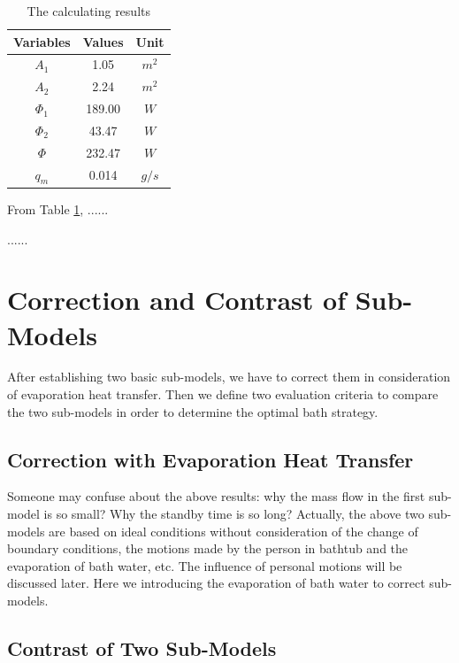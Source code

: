 \documentclass{mcmthesis}
\begin{document}
\begin{table}[h]  %
\centering        %
\caption{The calculating results}  %
\vspace{0.15cm}
\label{tab2}                       %
\begin{tabular}{|c|c|c|}  %
\hline                    %
Variables & Values & Unit     \\ \hline  %
$A_1$     & 1.05   &   $m^2$  \\ \hline
$A_2$     & 2.24   &   $m^2$  \\ \hline
$\Phi_1$  & 189.00 &   $W$   \\ \hline
$\Phi_2$  & 43.47  &   $W$   \\ \hline
$\Phi$    & 232.47 &   $W$   \\ \hline
$q_m$     & 0.014  &   $g/s$ \\ \hline
\end{tabular}
\end{table}

From Table \ref{tab2}, ......

......

\section{Correction and Contrast of Sub-Models}

After establishing two basic sub-models, we have to correct them in consideration of evaporation heat transfer. Then we define two evaluation criteria to compare the two sub-models in order to determine the optimal bath strategy.

\subsection{Correction with Evaporation Heat Transfer}

Someone may confuse about the above results: why the mass flow in the first sub-model is so small? Why the standby time is so long? Actually, the above two sub-models are based on ideal conditions without consideration of the change of boundary conditions, the motions made by the person in bathtub and the evaporation of bath water, etc. The influence of personal motions will be discussed later. Here we introducing the evaporation of bath water to correct sub-models.

\subsection{Contrast of Two Sub-Models}
\end{document}

